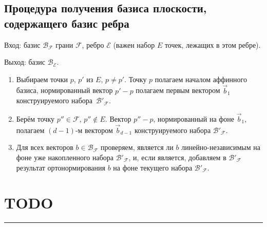 \documentclass[a4paper,12pt]{article}
\newcommand{\Facet}{\mathcal{F}} %
\newcommand{\Edge}{\mathcal{E}} %
\newcommand{\Basis}{\mathcal{B}} %
\begin{document}
    \subsection{Процедура получения базиса плоскости, содержащего базис ребра}
    Вход: базис $\Basis_{\Facet}$ грани $\Facet$, ребро $\Edge$ (важен набор $E$ точек, лежащих в этом ребре).

    Выход: базис $\Basis_{\Edge}$.
    \begin{enumerate}
      \item Выбираем точки $p$, $p'$ из $E$, $p \neq p'$. Точку $p$ полагаем началом аффинного базиса, нормированный вектор $p'-p$ полагаем первым вектором $\vec b_1$ конструируемого набора~$\Basis'_{\Facet}$.
      \item Берём точку $p'' \in \Facet$, $p'' \notin E$. Вектор $p''-p$, нормированный на фоне $\vec b_1$, полагаем $(d-1)$-м вектором $\vec b_{d-1}$ конструируемого набора $\Basis'_{\Facet}$.
      \item Для всех векторов $b \in \Basis_{\Facet}$ проверяем, является ли $b$ линейно-независимым на фоне уже накопленного набора $\Basis'_{\Facet}$, и, если является, добавляем в $\Basis'_{\Facet}$ результат ортонормирования $b$ на фоне текущего набора $\Basis'_{\Facet}$.
    \end{enumerate}



    \section{TODO}

  \hrule
\end{document}
